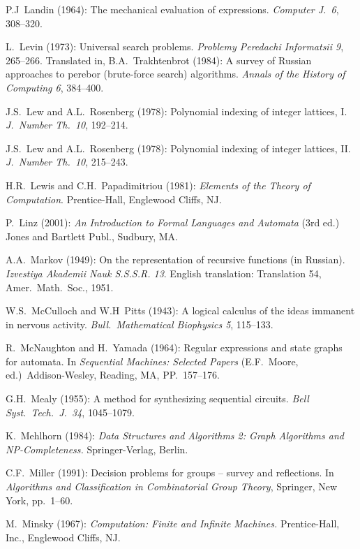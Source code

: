 \begin{thebibliography}{999}

P.J~Landin (1964): The mechanical evaluation of expressions.  {\it
  Computer J.~6}, 308--320.

L.~Levin (1973): Universal search problems.  {\it Problemy Peredachi
Informatsii 9}, 265--266.  Translated in, B.A.~Trakhtenbrot (1984): A
survey of Russian approaches to perebor (brute-force search)
algorithms.  {\it Annals of the History of Computing 6}, 384--400.

J.S.~Lew and A.L.~Rosenberg (1978): Polynomial indexing of integer
lattices, I.  {\it J.~Number Th.~10}, 192--214.
 
J.S.~Lew and A.L.~Rosenberg (1978): Polynomial indexing of integer
lattices, II.  {\it J.~Number Th.~10}, 215--243.

H.R.~Lewis and C.H.~Papadimitriou (1981):
{\it Elements of the Theory of Computation}.
Prentice-Hall, Englewood Cliffs, NJ.

P.~Linz (2001): {\it An Introduction to Formal Languages and Automata}
(3rd ed.)  Jones and Bartlett Publ., Sudbury, MA.


A.A.~Markov (1949): On the representation of recursive functions (in
Russian).  {\it Izvestiya Akademii Nauk S.S.S.R. 13}.  English
translation: Translation 54, Amer.~Math.~Soc., 1951.

W.S.~McCulloch and W.H~Pitts (1943): A logical calculus of the ideas
immanent in nervous activity.  {\it Bull.~Mathematical Biophysics 5},
115--133.

R.~McNaughton and H.~Yamada (1964): Regular expressions and state
graphs for automata.  In {\it Sequential Machines: Selected Papers}
(E.F.~Moore, ed.)~Addison-Wesley, Reading, MA, PP.~157--176.

G.H.~Mealy (1955): A method for synthesizing sequential circuits.
{\it Bell Syst.~Tech.~J.~34}, 1045--1079.

K.~Mehlhorn (1984):
{\it Data Structures and Algorithms 2: Graph Algorithms and
  NP-Completeness.}  Springer-Verlag, Berlin.

C.F.~Miller (1991): Decision problems for groups -- survey and
reflections.  In {\it Algorithms and Classification in Combinatorial
  Group Theory}, Springer, New York, pp.~1--60.

M.~Minsky (1967):
{\it Computation: Finite and Infinite Machines.}
Prentice-Hall, Inc., Englewood Cliffs, NJ. 


\end{thebibliography}
